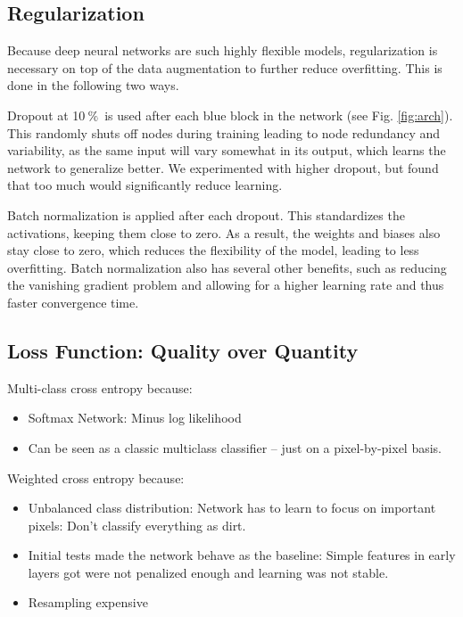 \documentclass{article}
\newcommand{\pro}{\ensuremath{\ \%}}
\begin{document}
\subsection{Regularization}
Because deep neural networks are such highly flexible models, regularization is necessary on top of the data augmentation to further reduce overfitting.
This is done in the following two ways.

Dropout at 10\pro\ is used after each blue block in the network (see Fig. \ref{fig:arch}).
This randomly shuts off nodes during training leading to node redundancy and variability, as the same input will vary somewhat in its output, which learns the network to generalize better.
We experimented with higher dropout, but found that too much would significantly reduce learning.

Batch normalization is applied after each dropout.
This standardizes the activations, keeping them close to zero.
As a result, the weights and biases also stay close to zero, which reduces the flexibility of the model, leading to less overfitting.
Batch normalization also has several other benefits, such as reducing the vanishing gradient problem and allowing for a higher learning rate and thus faster convergence time. \cite{bn}
\\

\subsection{Loss Function: Quality over Quantity}
Multi-class cross entropy because:
\begin{itemize}
	\item Softmax Network: Minus log likelihood
	\item Can be seen as a classic multiclass classifier -- just on a pixel-by-pixel basis.
\end{itemize}
Weighted cross entropy because:
\begin{itemize}
	\item Unbalanced class distribution: Network has to learn to focus on important pixels: Don't classify everything as dirt.
	\item Initial tests made the network behave as the baseline: Simple features in early layers got were not penalized enough and learning was not stable.
	\item Resampling expensive
\end{itemize}
\end{document}

